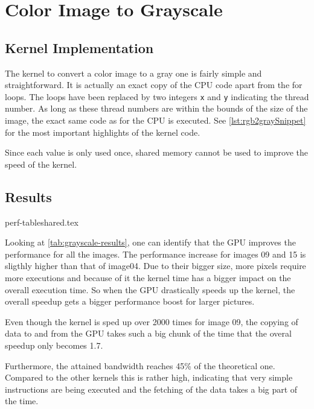 \documentclass[final]{report}
\begin{document}
\chapter{Color Image to Grayscale}\label{ch:grayscale}

\section{Kernel Implementation}\label{sec:rgb2gray}
The kernel to convert a color image to a gray one is fairly simple and straightforward.
It is actually an exact copy of the CPU code apart from the for loops.
The loops have been replaced by two integers \texttt{x} and \texttt{y} indicating the thread number.
As long as these thread numbers are within the bounds of the size of the image, the exact same code as for the CPU is executed.
See \cref{lst:rgb2graySnippet} for the most important highlights of the kernel code.


Since each value is only used once, shared memory cannot be used to improve the speed of the kernel.


\section{Results}
{perf-tableshared.tex}

Looking at \cref{tab:grayscale-results}, one can identify that the GPU improves the performance for all the images.
The performance increase for images 09 and 15 is sligthly higher than that of image04.
Due to their bigger size, more pixels require more executions and because of it the kernel time has a bigger impact on the overall execution time.
So when the GPU drastically speeds up the kernel, the overall speedup gets a bigger performance boost for larger pictures.

Even though the kernel is sped up over 2000 times for image 09, the copying of data to and from the GPU takes such a big chunk of the time that the overal speedup only becomes 1.7.

Furthermore, the attained bandwidth reaches 45\% of the theoretical one.
Compared to the other kernels this is rather high, indicating that very simple instructions are being executed and the fetching of the data takes a big part of the time.
\end{document}
